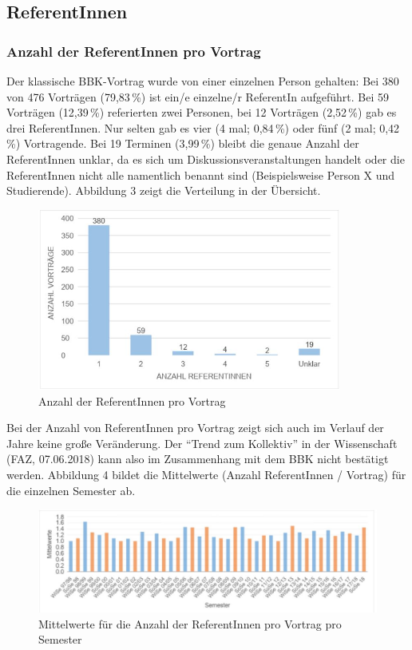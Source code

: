 \documentclass[a4paper,
fontsize=11pt,
oneside,
numbers=noperiodatend,
parskip=half-,
bibliography=totoc,
final
]{scrartcl}
\begin{document}
\hypertarget{referentinnen}{%
\subsection{ReferentInnen}\label{referentinnen}}

\hypertarget{anzahl-der-referentinnen-pro-vortrag}{%
\subsubsection{Anzahl der ReferentInnen pro
Vortrag}\label{anzahl-der-referentinnen-pro-vortrag}}

Der klassische BBK-Vortrag wurde von einer einzelnen Person gehalten:
Bei 380 von 476 Vorträgen (79,83\,\%) ist ein/e einzelne/r ReferentIn
aufgeführt. Bei 59 Vorträgen (12,39\,\%) referierten zwei Personen, bei
12 Vorträgen (2,52\,\%) gab es drei ReferentInnen. Nur selten gab es vier
(4 mal; 0,84\,\%) oder fünf (2 mal; 0,42\,\%) Vortragende. Bei 19 Terminen
(3,99\,\%) bleibt die genaue Anzahl der ReferentInnen unklar, da es sich
um Diskussionsveranstaltungen handelt oder die ReferentInnen nicht alle
namentlich benannt sind (Beispielsweise Person X und Studierende).
Abbildung 3 zeigt die Verteilung in der Übersicht.

\begin{figure}[h!]
\centering
\includegraphics[width=10cm]{img/Abbildung3.JPG}
\caption{Anzahl der ReferentInnen pro Vortrag}
\end{figure}

Bei der Anzahl von ReferentInnen pro Vortrag zeigt sich auch im Verlauf
der Jahre keine große Veränderung. Der \enquote{Trend zum Kollektiv} in
der Wissenschaft (FAZ, 07.06.2018) kann also im Zusammenhang mit dem BBK
nicht bestätigt werden. Abbildung 4 bildet die Mittelwerte (Anzahl
ReferentInnen / Vortrag) für die einzelnen Semester ab.

\begin{figure}[h!]
\centering
\includegraphics[width=15cm]{img/Abbildung4.JPG}
\caption{Mittelwerte für die Anzahl der ReferentInnen pro Vortrag pro
Semester}
\end{figure}
\end{document}
